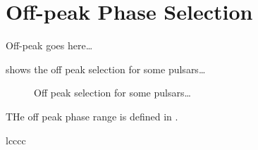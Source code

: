 \section{Off-peak Phase Selection}

Off-peak goes here\ldots

 shows the off peak selection for some pulsars\dots

\begin{figure}
  \ifdefined\bwfigures
  \else
  \fi
  \caption{Off peak selection for some pulsars\dots}
  \label{fig:off_peak_select}
\end{figure}

THe off peak phase range is defined in .


\begin{deluxetable}{lcccc}
  \tabletypesize{\scriptsize}
  
\end{deluxetable}

